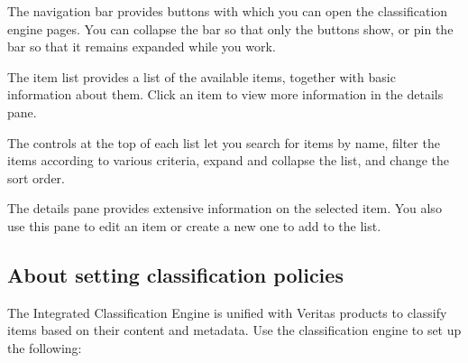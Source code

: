\documentclass[letterpaper,10pt,english]{sphinxmanual}
\begin{document}
The navigation bar provides buttons with which you can open the classification engine pages. You can collapse the bar so that only the buttons show, or pin the bar so that it remains expanded while you work.

\begin{figure}[htbp]
\centering

\noindent{}
\end{figure}


The item list provides a list of the available items, together with basic information about them. Click an item to view more information in the details pane.

The controls at the top of each list let you search for items by name, filter the items according to various criteria, expand and collapse the list, and change the sort order.

\begin{figure}[htbp]
\centering

\noindent{}
\end{figure}


The details pane provides extensive information on the selected item. You also use this pane to edit an item or create a new one to add to the list.


\subsection{About setting classification policies}
\label{\detokenize{mcdmp_app_ug:about-setting-classification-policies}}
The Integrated Classification Engine is unified with Veritas products to  classify items based on their content and metadata. Use the classification engine to set up the following:
\end{document}
